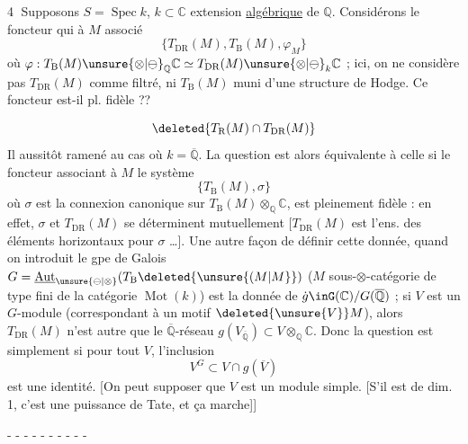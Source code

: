 \textcircled{4}  Supposons $S=\operatorname{Spec}k$, $k\subset\mathbb C$ extension \uline{algébrique} de $\mathbb Q$. Considérons le foncteur qui à $M$ associé
\begingroup\makeatletter\tagsleft@true\makeatother
\[
\bigl\{T_{\mathrm{DR}}(M),T_{\mathrm B}(M),\varphi_M\bigr\} \tag*{(4.1)}
\]
\endgroup
où $\varphi:T_{\mathrm B}(M)\unsure{\otimes|\ominus}_{\mathbb Q}\mathbb C\simeq T_{\mathrm{DR}}(M)\unsure{\otimes|\ominus}_k\mathbb C$ ; ici, on ne considère pas $T_{\mathrm{DR}}(M)$ comme filtré,  ni $T_{\mathrm B}(M)$ muni d'une structure de Hodge. Ce foncteur est-il pl. fidèle ??

\[
\deleted{T_{\mathrm R}(M)\cap T_{\mathrm{DR}}(M)}
\]
Il  aussitôt ramené au cas où $k=\overline{\mathbb Q}$. La question est alors équivalente à celle si le foncteur associant à $M$ le système
\begingroup\makeatletter\tagsleft@true\makeatother
\[
\bigl\{T_{\mathrm B}(M),\sigma\bigr\} \tag*{(4.2)}
\]
\endgroup
où $\sigma$ est la connexion canonique sur $T_{\mathrm B}(M)\otimes_{\mathbb Q}\mathbb C$, est pleinement fidèle : en effet, $\sigma$ et $T_{\mathrm{DR}}(M)$ se déterminent mutuellement [$T_{\mathrm{DR}}(M)$ est l'ens. des éléments  horizontaux pour $\sigma$ \ldots].
Une autre façon de définir cette donnée,  quand on introduit le gpe de Galois $G=\underline{\operatorname{Aut}}_{\unsure{\ominus|\otimes}}(T_{\mathrm B}\deleted{\unsure{(M|M}})$  ($M$ sous-$\otimes$-catégorie de type fini de la catégorie $\operatorname{Mot}(k)$) est la donnée de $\dot g\inG(\mathbb C)/G(\overline{\mathbb Q})$ ; si $V$ est un $G$-module (correspondant à un motif $\deleted{\unsure{V}}M$), alors
$T_{\mathrm{DR}}(M)$ n'est autre que le $\overline{\mathbb Q}$-réseau $g(V_{\overline{\mathbb Q}})\subset V\otimes_{\mathbb Q}\mathbb C$. Donc la question est simplement si pour tout $V$, l'inclusion
\[
V^G\subset V\cap g(\overline V)
\]
est une identité. [On peut supposer que $V$ est un module simple. [S'il est de dim. 1, c'est une puissance de Tate, et ça marche]] 
\par\hfill - - - - - - - - - -

